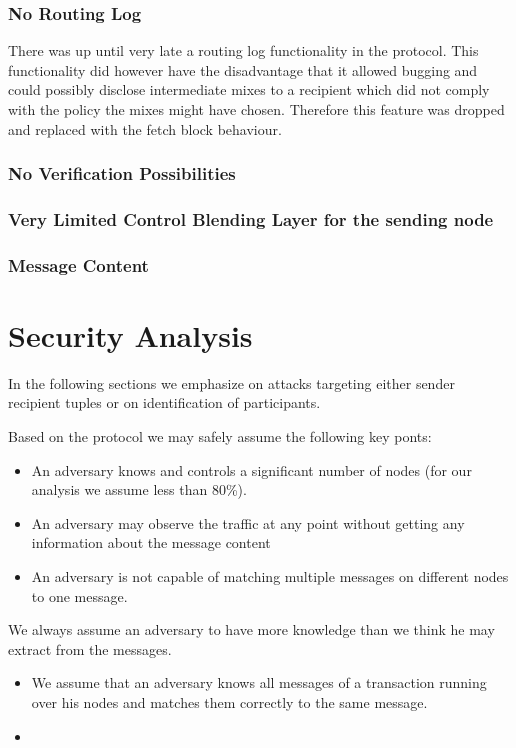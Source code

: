 \subsection{No Routing Log}
There was up until very late a routing log functionality in the protocol. This functionality did however have the disadvantage that it allowed bugging and could possibly  disclose intermediate mixes to a recipient which did not comply with the policy the mixes might have chosen. Therefore this feature was dropped and replaced with the fetch block behaviour.

\subsection{No Verification Possibilities}

\subsection{Very Limited Control Blending Layer for the sending node}

\subsection{Message Content}

\chapter{Security Analysis}
In the following sections we emphasize on attacks targeting either sender recipient tuples or on identification of participants. 

Based on the protocol we may safely assume the following key ponts:
\begin{itemize}
	\item An adversary knows and controls a significant number of nodes (for our analysis we assume less than 80\%).
	\item An adversary may observe the traffic at any point without getting any information about the message content
	\item An adversary is not capable of matching multiple messages on different nodes to one message.
\end{itemize}

We always assume an adversary to have more knowledge than we think he may extract from the messages.
\begin{itemize}
	\item We assume that an adversary knows all messages of a transaction running over his nodes and matches them correctly to the same message.
	\item 
\end{itemize}

